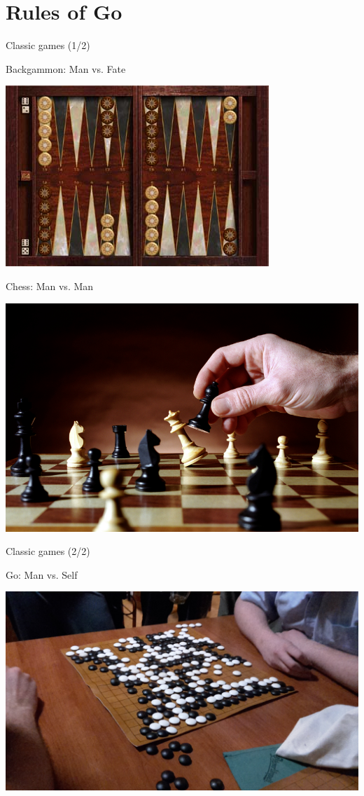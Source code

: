 \documentclass{beamer}
\begin{document}
  \section{Rules of Go}
  \begin{frame}{Classic games (1/2)}
    \pause
    \begin{center}
      \tiny
      Backgammon: Man vs. Fate

      \includegraphics[height=.4\textheight]{../img/backgammon.jpg}
      \pause

      Chess: Man vs. Man

      \includegraphics[height=.4\textheight]{../img/chess.jpg}
    \end{center}
  \end{frame}

  \begin{frame}{Classic games (2/2)}
    \begin{center}
      Go: Man vs. Self

      \includegraphics[width=.9\textwidth]{../img/Go_Samal_vs_Kral.jpg}
    \end{center}
  \end{frame}
\end{document}
